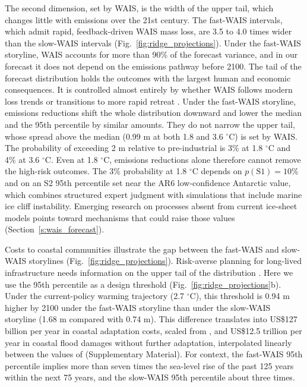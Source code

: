 \documentclass[draft,linenumbers]{agujournal2025}
\begin{document}
The second dimension, set by WAIS, is the width of the upper tail, which changes little with emissions over the 21st century. The fast-WAIS intervals, which admit rapid, feedback-driven WAIS mass loss, are 3.5 to 4.0 times wider than the slow-WAIS intervals (Fig.~\ref{fig:ridge_projections}). Under the fast-WAIS storyline, WAIS accounts for more than 90\% of the forecast variance, and in our forecast it does not depend on the emissions pathway before 2100. The tail of the forecast distribution holds the outcomes with the largest human and economic consequences. It is controlled almost entirely by whether WAIS follows modern loss trends or transitions to more rapid retreat \citep{Turney2020, Dutton2015, Graham2022}. Under the fast-WAIS storyline, emissions reductions shift the whole distribution downward and lower the median and the 95th percentile by similar amounts. They do not narrow the upper tail, whose spread above the median (0.99 m at both 1.8 and 3.6 $^\circ$C) is set by WAIS. The probability of exceeding 2 m relative to pre-industrial is 3\% at 1.8 $^\circ$C and 4\% at 3.6 $^\circ$C. Even at 1.8 $^\circ$C, emissions reductions alone therefore cannot remove the high-risk outcomes. The 3\% probability at 1.8 $^\circ$C depends on $p(\mathrm{S1}) = 10\%$ and on an S2 95th percentile set near the AR6 low-confidence Antarctic value, which combines structured expert judgment with simulations that include marine ice cliff instability. Emerging research on processes absent from current ice-sheet models points toward mechanisms that could raise those values (Section~\ref{s:wais_forecast}).


Costs to coastal communities illustrate the gap between the fast-WAIS and slow-WAIS storylines (Fig.~\ref{fig:ridge_projections}). Risk-averse planning for long-lived infrastructure needs information on the upper tail of the distribution \citep{vandeWal2022}. Here we use the 95th percentile as a design threshold (Fig.~\ref{fig:ridge_projections}b). Under the current-policy warming trajectory (2.7 $^\circ$C), this threshold is 0.94 m higher by 2100 under the fast-WAIS storyline than under the slow-WAIS storyline (1.68 m compared with 0.74 m). This difference translates into US\$127 billion per year in coastal adaptation costs, scaled from \citet{Tiggeloven2020}, and US\$12.5 trillion per year in coastal flood damages without further adaptation, interpolated linearly between the values of \citet{Jevrejeva2018} (Supplementary Material). For context, the fast-WAIS 95th percentile implies more than seven times the sea-level rise of the past 125 years within the next 75 years, and the slow-WAIS 95th percentile about three times.
\end{document}
